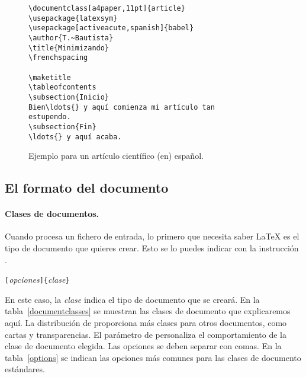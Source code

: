 \begin{figure}[!bp]
\begin{lined}{10cm}
\begin{verbatim}
\documentclass[a4paper,11pt]{article}
\usepackage{latexsym}
\usepackage[activeacute,spanish]{babel}
\author{T.~Bautista}
\title{Minimizando}
\frenchspacing

\maketitle
\tableofcontents
\subsection{Inicio}
Bien\ldots{} y aquí comienza mi artículo tan
estupendo.
\subsection{Fin}
\ldots{} y aquí acaba.

\end{verbatim}
\end{lined}
\caption{Ejemplo para un artículo científico (en) español.} \label{document}
\end{figure}
 
\subsection{El formato del documento}
 
\paragraph{Clases de documentos.}\label{sec:documentclass}

Cuando procesa  un fichero de  entrada, lo primero que  necesita saber
\LaTeX{} es el tipo de documento  que quieres crear. Esto se lo puedes
indicar con la instrucción .

\begin{command}
\verb|[|\emph{opciones}\verb|]{|\emph{clase}\verb|}|
\end{command}

\noindent En  este caso, la  \emph{clase} indica el tipo  de documento
que  se  creará. En  la  tabla~\ref{documentclasses}  se muestran  las
clases  de  documento  que   explicaremos  aquí.  La  distribución  de
\LaTeXe{} proporciona más clases para  otros documentos, como cartas y
transparencias.  El parámetro  de \emph{}  personaliza el
comportamiento de la clase de documento elegida. Las opciones se deben
separar con comas.  En la tabla~\ref{options} se  indican las opciones
más comunes para las clases de documento estándares.

